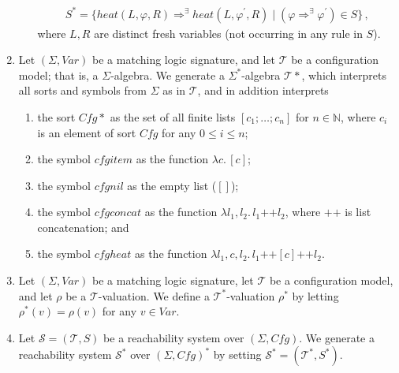 \documentclass{article}
\begin{document}
\begin{definition}
\begin{enumerate}
\begin{enumerate}
\begin{align*}
              S^* = \{ \mathit{heat}(L, \varphi, R) \Rightarrow^\exists \mathit{heat}(L, \varphi^\prime, R)
              \mid  ( \varphi \Rightarrow^\exists \varphi^\prime ) \in S \} \, ,
            \end{align*}
                          where $L,R$ are distinct fresh variables (not occurring in any rule in $S$).
          \end{enumerate}
    \item Let $(\Sigma, \mathit{Var})$ be a matching logic signature, and let $\mathcal{T}$ be a configuration model; that is, a $\Sigma$-algebra.
          We generate a $\Sigma^*$-algebra $\mathcal{T}*$, which interprets all sorts and symbols from
          $\Sigma$ as in $\mathcal{T}$, and in addition interprets
          \begin{enumerate}
              \item the sort $\mathit{Cfg}*$ as the set of all finite lists
              $[c_1;\ldots;c_n]$ for $n \in \mathbb{N}$, where $c_i$ is an element of sort $\mathit{Cfg}$
              for any $0 \leq i \leq n$;
              \item the symbol $\mathit{cfgitem}$ as the function $\lambda c.\, [c]$;
              \item the symbol $\mathit{cfgnil}$ as the empty list ($[]$);
              \item the symbol $\mathit{cfgconcat}$ as the function $\lambda l_1,l_2.\, l_1 \texttt{++} l_2$,
                where $\texttt{++}$ is list concatenation; and
              \item the symbol $\mathit{cfgheat}$ as the function
                $\lambda l_1, c, l_2.\, l_1 \texttt{++} [c] \texttt{++} l_2$.
          \end{enumerate}

    \item Let $(\Sigma, \mathit{Var})$ be a matching logic signature, let $\mathcal{T}$ be a configuration model,
        and let $\rho$ be a $\mathcal{T}$-valuation.
        We define a $\mathcal{T}^*$-valuation $\rho^*$ by letting $\rho^*(v) = \rho(v)$ for any $v \in \mathit{Var}$.
          
    \item Let $\mathcal{S} = (\mathcal{T}, S)$ be a reachability system over $(\Sigma, \mathit{Cfg})$.
          We generate a reachability system $\mathcal{S}^*$ over $(\Sigma, \mathit{Cfg})^*$
          by setting $\mathcal{S}^* = (\mathcal{T}^*, S^*)$.
\end{enumerate}
\end{definition}
\end{document}
